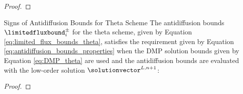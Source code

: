 \begin{proof}
\end{proof}
\begin{theorem}{Signs of Antidiffusion Bounds for Theta Scheme}
The antidiffusion bounds $\limitedfluxbound_i^\pm$ for the theta
scheme, given by Equation \eqref{eq:limited_flux_bounds_theta},
satisfies the requirement given by Equation
\eqref{eq:antidiffusion_bounds_properties} when the DMP solution bounds given
by Equation \eqref{eq:DMP_theta} are used and the antidiffusion bounds are
evaluated with the low-order solution $\solutionvector^{L,n+1}$:
\end{theorem}

\begin{proof}
\end{proof}

